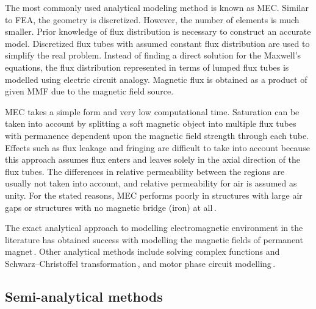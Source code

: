     
        The most commonly used analytical modeling method is known as \ac{MEC}. Similar to \acs{FEA}, the geometry is discretized. However, the number of elements is much smaller. Prior knowledge of flux distribution is necessary to construct an accurate model. Discretized flux tubes with assumed constant flux distribution are used to simplify the real problem. Instead of finding a direct solution for the Maxwell's equations, the flux distribution represented in terms of lumped flux tubes is modelled using electric circuit analogy. Magnetic flux is obtained as a product of given \ac{MMF} due to the magnetic field source.  
        
        
        \acs{MEC} takes a simple form and very low computational time. Saturation can be taken into account by splitting a soft magnetic object into multiple flux tubes with permanence dependent upon the magnetic field strength through each tube. Effects such as flux leakage and fringing are difficult to take into account because this approach assumes flux enters and leaves solely in the axial direction of the flux tubes. The differences in relative permeability between the regions are usually not taken into account, and relative permeability for air is assumed as unity. For the stated reasons, \acs{MEC} performs poorly in structures with large air gaps or structures with no magnetic bridge (iron) at all\,\cite{DeBoeij2006}. 
        
        
        The exact analytical approach to modelling electromagnetic environment in the literature has obtained success with modelling the magnetic fields of permanent magnet\,\cite{Ravaud2010}. Other analytical methods include solving complex functions and Schwarz–Christoffel transformation\,\cite{Zarko2006}, and motor phase circuit modelling\,\cite{Proca2003}.
        
        
    \subsection{Semi-analytical methods}            \label{Chapter:background/modelling techniques for designing motors/semi-analytical methods}
    
